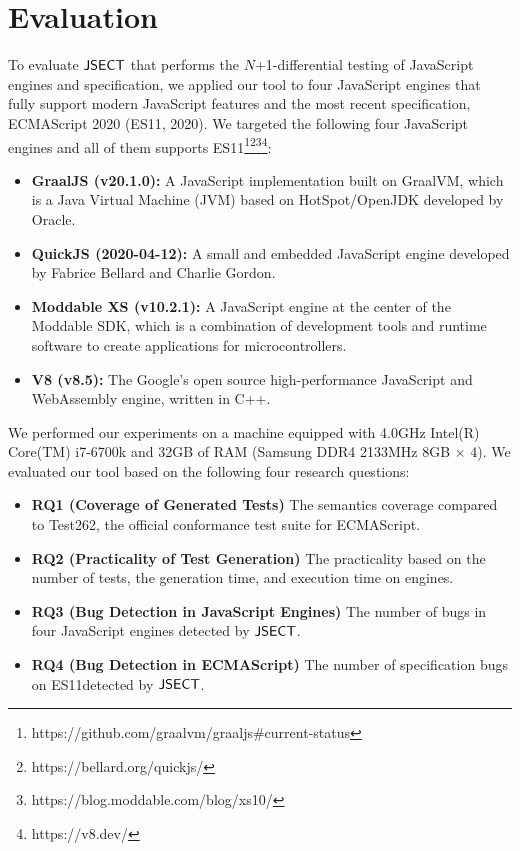 \section{Evaluation}\label{sec:eval}

To evaluate $\text{\sf JSECT}$ that performs the $N$+1-differential testing of JavaScript
engines and specification, we applied our tool to four JavaScript engines that
fully support modern JavaScript features and the most recent specification,
ECMAScript 2020 (ES11, 2020).  We targeted the following four JavaScript
engines and all of them supports
ES11\footnote{https://github.com/graalvm/graaljs\#current-status}\footnote{https://bellard.org/quickjs/}\footnote{https://blog.moddable.com/blog/xs10/}\footnote{https://v8.dev/}:
\begin{itemize}
  \item \textbf{GraalJS (v20.1.0):} A JavaScript implementation built on
    GraalVM\cite{graaljs}, which is a Java Virtual Machine (JVM) based on
    HotSpot/OpenJDK developed by Oracle.
  \item \textbf{QuickJS (2020-04-12):} A small and embedded JavaScript engine developed by
    Fabrice Bellard and Charlie Gordon\cite{qjs}.
  \item \textbf{Moddable XS (v10.2.1):} A JavaScript engine at the center of the Moddable
    SDK\cite{xs}, which is a combination of development tools and runtime
    software to create applications for microcontrollers.
  \item \textbf{V8 (v8.5):} The Google's open source high-performance JavaScript and
    WebAssembly engine\cite{v8}, written in C++.
\end{itemize}
We performed our experiments on a machine equipped with 4.0GHz Intel(R) Core(TM)
i7-6700k and 32GB of RAM (Samsung DDR4 2133MHz 8GB $\times$ 4).  We evaluated our
tool based on the following four research questions:
\begin{itemize}
  \item {\bf RQ1 (Coverage of Generated Tests)} The semantics coverage compared
    to Test262, the official conformance test suite for ECMAScript.
  \item {\bf RQ2 (Practicality of Test Generation)} The practicality based on
    the number of tests, the generation time, and execution time on engines.
  \item {\bf RQ3 (Bug Detection in JavaScript Engines)} The number of bugs in
    four JavaScript engines detected by $\text{\sf JSECT}$.
  \item {\bf RQ4 (Bug Detection in ECMAScript)} The number of specification bugs
    on ES11detected by $\text{\sf JSECT}$.
\end{itemize}

